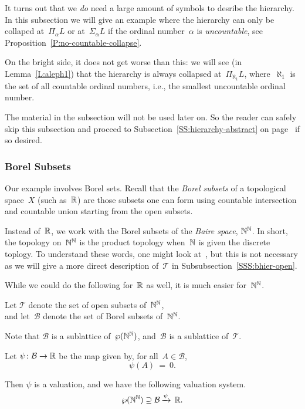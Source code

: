 \documentclass[main.tex]{subfiles}
\begin{document}
It turns out that we \emph{do} need a large amount of symbols
to desribe the hierarchy.
In this subsection we will give an example
where the hierarchy can only be collaped at~$\Pi_\alpha L$
or at~$\Sigma_\alpha L$
if the ordinal number~$\alpha$ is \emph{uncountable},
see Proposition~\ref{P:no-countable-collapse}.

On the bright side,
it does not get worse than this:
we will see 
(in Lemma~\ref{L:aleph1})
that 
the hierarchy is always collapsed at~$\Pi_{\aleph_1} L$,
where~$\aleph_1$
is the set of all countable ordinal numbers,
i.e., the smallest uncountable ordinal number.

The material in the subsection will not be used later on.
So the reader can safely skip this subsection
and proceed to Subsection~\ref{SS:hierarchy-abstract} 
on page~\pageref{SS:hierarchy-abstract}
if so desired.

\subsubsection{Borel Subsets}$\,$\\
Our example involves Borel sets.
Recall that the \emph{Borel subsets}
of a topological space~$X$
(such as~$\mathbb{R}$)
are those subsets one can form using countable intersection
and countable union starting from the open subsets.

Instead of~$\mathbb{R}$,
we  work with the Borel subsets
of the 
 \emph{Baire space},
 $\mathbb{N}^{\mathbb{N}}$.
In short,
the topology on~$\mathbb{N}^{\mathbb{N}}$
is the product topology
when~$\mathbb{N}$ is given the discrete toplogy.
To understand these words,
one might look at~\cite{Willard70},
but this is not necessary as we will
give a more direct description of~$\mathcal{T}$
in Subsubsection~\ref{SSS:bhier-open}.

While we could do the following
for~$\mathbb{R}$ as well,
it is much easier for~$\mathbb{N}^{\mathbb{N}}$.
\begin{nt}
Let $\mathcal{T}$
denote the set of open subsets of~$\mathbb{N}^{\mathbb{N}}$, \\
and let~$\mathcal{B}$
denote the set of Borel subsets of~$\mathbb{N}^{\mathbb{N}}$.
\end{nt}
Note that $\mathcal{B}$
is a sublattice of~$\wp(\mathbb{N}^{\mathbb{N}})$,
and~$\mathcal{B}$ is a sublattice of~$\mathcal{T}$.

\begin{dfn}
Let $\psi\colon \mathcal{B}\rightarrow \mathbb{R}$
be the map given by, for all~$A\in \mathcal{B}$,
\begin{equation*}
\psi(A)\ =\ 0.
\end{equation*}
\end{dfn}
Then $\psi$ is a valuation,
and we have the following valuation system.
\begin{equation*}
\wp(\mathbb{N}^{\mathbb{N}}) \supseteq \mathcal{B}\,\smash{\xrightarrow{\psi}\,\mathbb{R}}.
\end{equation*}
\end{document}
